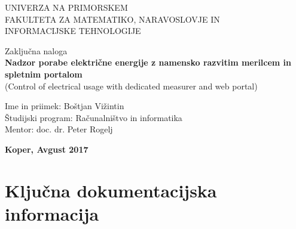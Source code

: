 \documentclass[12pt,a4paper,titlepage,openany]{report}
\begin{document}
\pagestyle{empty}
\begin{center}
\noindent \large UNIVERZA NA PRIMORSKEM\\
\large FAKULTETA ZA MATEMATIKO, NARAVOSLOVJE IN\\
INFORMACIJSKE TEHNOLOGIJE


\normalsize
\vspace{6cm}
Zaključna naloga\\
\textbf{\large Nadzor porabe električne energije z namensko razvitim merilcem in  spletnim portalom}\\
\normalsize
(Control of electrical usage with dedicated measurer and  web portal)\\
\end{center}

\begin{flushleft}
\vspace{5cm}
\noindent Ime in priimek: Boštjan Vižintin
\\
\noindent Študijski program: Računalništvo in informatika
\\
\noindent Mentor: doc. dr.  Peter Rogelj

\end{flushleft}

\vspace{4cm}
\begin{center}
\large \textbf{Koper, Avgust 2017}
\end{center}
\newpage

\pagestyle{fancy}

\section*{Ključna dokumentacijska informacija}
\end{document}
